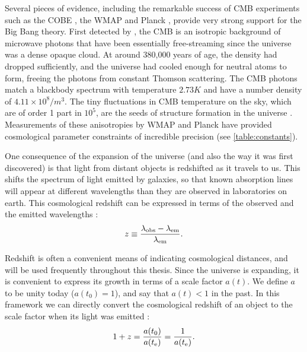 Several pieces of evidence, including the remarkable success of \acf{CMB} experiments such as the \acf{COBE} \citep{COBE96}, the \acf{WMAP} \citep{WMAP9} and Planck \citep{PlanckXVI}, provide very strong support for the Big Bang theory. First detected by \citet{PenziasWilson65}, the \ac{CMB} is an isotropic background of microwave photons that have been essentially free-streaming since the universe was a dense opaque cloud. At around 380,000 years of age, the density had dropped sufficiently, and the universe had cooled enough for neutral atoms to form, freeing the photons from constant Thomson scattering. The \ac{CMB} photons match a blackbody spectrum with temperature $2.73 K$ and have a number density of $4.11 \times 10^8 / m^3$. The tiny fluctuations in \ac{CMB} temperature on the sky, which are of order 1 part in $10^5$, are the seeds of structure formation in the universe \citep{RydenText}. Measurements of these anisotropies by \ac{WMAP} and Planck have provided cosmological parameter constraints of incredible precision (see \autoref{table:constants}).

One consequence of the expansion of the universe (and also the way it was first discovered) is that light from distant objects is redshifted as it travels to us. This shifts the spectrum of light emitted by galaxies, so that known absorption lines will appear at different wavelengths than they are observed in laboratories on earth. This cosmological redshift can be expressed in terms of the observed and the emitted wavelengths \citep{RydenText}:
\begin{equation}
z \equiv \frac{\lambda_{\rm obs} - \lambda_{\rm em}}{\lambda_{\rm em}}.
\end{equation}

Redshift is often a convenient means of indicating cosmological distances, and will be used frequently throughout this thesis. Since the universe is expanding, it is convenient to express its growth in terms of a scale factor $a(t)$. We define $a$ to be unity today ($a(t_0)=1$), and say that $a(t)<1$ in the past. In this framework we can directly convert the cosmological redshift of an object to the scale factor when its light was emitted \citep{RydenText}:
\begin{equation}
1+z = \frac{a(t_0)}{a(t_{\rm e})} = \frac{1}{a(t_{\rm e})}.
\label{eq:z}
\end{equation}

